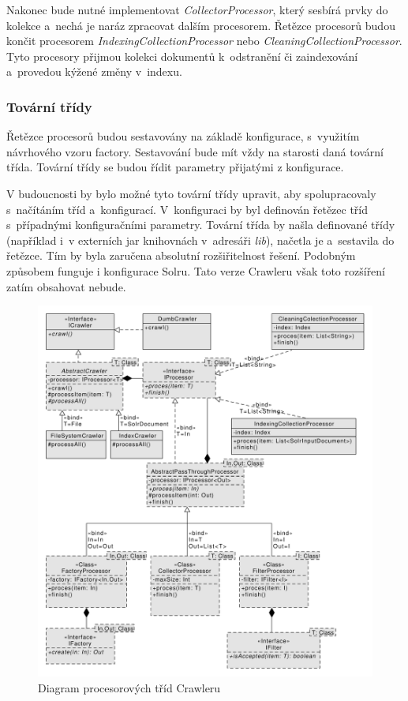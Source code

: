Nakonec bude nutné implementovat \emph{CollectorProcessor}, který sesbírá prvky do kolekce a~nechá je naráz zpracovat dalším procesorem. Řetězce procesorů budou končit procesorem  \emph{IndexingCollectionProcessor} nebo \emph{CleaningCollectionProcessor}. Tyto procesory přijmou kolekci dokumentů k~odstranění či zaindexování a~provedou kýžené změny v~indexu.

\subsubsection{Tovární třídy}
Řetězce procesorů budou sestavovány na základě konfigurace, s~využitím návrhového vzoru factory. Sestavování bude mít vždy na starosti daná tovární třída. Tovární třídy se budou řídit parametry přijatými z konfigurace.

V budoucnosti by bylo možné tyto tovární třídy upravit, aby spolupracovaly s~načítáním tříd a~konfigurací. V~konfiguraci by byl definován řetězec tříd s~případnými konfiguračními parametry. Tovární třída by našla definované třídy (například i~v externích jar knihovnách v~adresáři \emph{lib}), načetla je a~sestavila do řetězce. Tím by byla zaručena absolutní rozšiřitelnost řešení. Podobným způsobem funguje i konfigurace Solru. Tato verze Crawleru však toto rozšíření zatím obsahovat nebude.

\begin{figure}[h]
\begin{center}
\includegraphics[width=13cm]{ProcessorClasses}
\caption{Diagram procesorových tříd Crawleru}
\label{fig:ProcessorClasses}
\end{center}
\end{figure}

